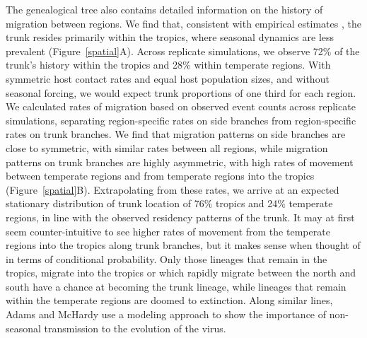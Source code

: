 \documentclass[11pt,oneside,letterpaper]{article}
\begin{document}
The genealogical tree also contains detailed information on the history of migration between regions.  We find that, consistent with empirical estimates \cite{Russell08,Bedford10}, the trunk resides primarily within the tropics, where seasonal dynamics are less prevalent (Figure~\ref{spatial}A).  Across replicate simulations, we observe 72\% of the trunk's history within the tropics and 28\% within temperate regions.  With symmetric host contact rates and equal host population sizes, and without seasonal forcing, we would expect trunk proportions of one third for each region.  We calculated rates of migration based on observed event counts across replicate simulations, separating region-specific rates on side branches from region-specific rates on trunk branches.  We find that migration patterns on side branches are close to symmetric, with similar rates between all regions, while migration patterns on trunk branches are highly asymmetric, with high rates of movement between temperate regions and from temperate regions into the tropics (Figure~\ref{spatial}B).  Extrapolating from these rates, we arrive at an expected stationary distribution of trunk location of 76\% tropics and 24\% temperate regions, in line with the observed residency patterns of the trunk.  It may at first seem counter-intuitive to see higher rates of movement from the temperate regions into the tropics along trunk branches, but it makes sense when thought of in terms of conditional probability.  Only those lineages that remain in the tropics, migrate into the tropics or which rapidly migrate between the north and south have a chance at becoming the trunk lineage, while lineages that remain within the temperate regions are doomed to extinction.  Along similar lines, Adams and McHardy \cite{Adams11} use a modeling approach to show the importance of non-seasonal transmission to the evolution of the virus.
\end{document}
